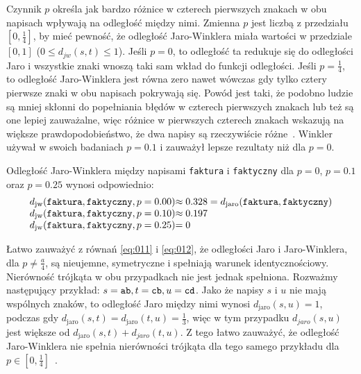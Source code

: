 \documentclass{praca1}
\begin{document}
Czynnik $p$ określa jak bardzo różnice w czterech pierwszych znakach w obu napisach wpływają na odległość między nimi. Zmienna $p$ jest liczbą z przedziału $[0, \frac{1}{4}]$, by mieć pewność, że odległość Jaro-Winklera miała wartości w przedziale $[0,1]$ ($0 \leq d_{jw}(s,t) \leq 1$). Jeśli $p=0$, to odległość ta redukuje się do odległości Jaro i wszystkie znaki wnoszą taki sam wkład do funkcji odległości. Jeśli $p = \frac{1}{4}$, to odległość Jaro-Winklera jest równa zero nawet wówczas gdy tylko cztery pierwsze znaki w obu napisach pokrywają się. Powód jest taki, że podobno ludzie są mniej skłonni do popełniania błędów w czterech pierwszych znakach lub też są one lepiej zauważalne, więc różnice w pierwszych czterech znakach wskazują na większe prawdopodobieństwo, że dwa napisy są rzeczywiście różne~\cite{Loo2014:stringdist}. Winkler~\cite{Winkler1990:stringcomparator} używał w swoich badaniach $p = 0.1$ i zauważył lepsze rezultaty niż dla $p = 0$.

\begin{example}
Odległość Jaro-Winklera między napisami \verb|faktura| i \verb|faktyczny| dla $p = 0$, $p = 0.1$ oraz $p = 0.25$ wynosi odpowiednio: 
\begin{equation*}
  \left.\begin{array}{l@{}l}
    d_{\mathrm{jw}}(\verb|faktura|, \verb|faktyczny|, p = 0.00) & \approx 0.328 = d_{\mathrm{jaro}}(\verb|faktura|, \verb|faktyczny|) \\
    d_{\mathrm{jw}}(\verb|faktura|, \verb|faktyczny|, p = 0.10) & \approx 0.197  \\
    d_{\mathrm{jw}}(\verb|faktura|, \verb|faktyczny|, p = 0.25) & =  0
  \end{array}\right.
\end{equation*}
\end{example}

Łatwo zauważyć z równań \ref{eq:011} i \ref{eq:012}, że odległości Jaro i Jaro-Winklera, dla $p \neq \frac{a}{4}$, są nieujemne,  symetryczne i spełniają warunek identycznościowy. Nierówność trójkąta w obu przypadkach nie jest jednak spełniona. Rozważmy następujący przykład: $s = \verb|ab|, t = \verb|cb|, u = \verb|cd|$. Jako że napisy $s$ i $u$ nie mają wspólnych znaków, to odległość Jaro między nimi wynosi $d_{\mathrm{jaro}}(s, u) = 1$, podczas gdy $d_{\mathrm{jaro}}(s, t) = d_{\mathrm{jaro}}(t, u) = \frac{1}{3}$, więc w tym przypadku $d_{jaro}(s, u)$ jest większe od $d_{\mathrm{jaro}}(s, t) + d_{jaro}(t, u)$. Z tego łatwo zauważyć, że odległość Jaro-Winklera nie spełnia nierówności trójkąta  dla tego samego przykładu dla $p \in [0, \frac{1}{4}]$~\cite{Loo2014:stringdist}.
\end{document}
